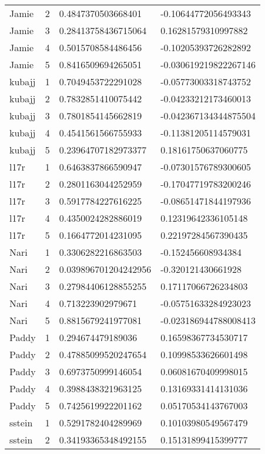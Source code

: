 \begin{longtable}{@{}lcll@{}}
      Jamie & 2 & 0.4847370503668401 & -0.10644772056493343 \\
      Jamie & 3 & 0.28413758436715064 & 0.16281579310997882 \\
      Jamie & 4 & 0.5015708584486456 & -0.10205393726282892 \\
      Jamie & 5 & 0.8416509694265051 & -0.030619219822267146 \\
      kubajj & 1 & 0.7049453722291028 & -0.05773003318743752 \\
      kubajj & 2 & 0.7832851410075442 & -0.04233212173460013 \\
      kubajj & 3 & 0.7801854145662819 & -0.042367134344875504 \\
      kubajj & 4 & 0.4541561566755933 & -0.11381205114579031 \\
      kubajj & 5 & 0.23964707182973377 & 0.18161750637060775 \\
      l17r & 1 & 0.6463837866590947 & -0.07301576789300605 \\
      l17r & 2 & 0.2801163044252959 & -0.17047719783200246 \\
      l17r & 3 & 0.5917784227616225 & -0.08651471844197936 \\
      l17r & 4 & 0.4350024282886019 & 0.12319642336105148 \\
      l17r & 5 & 0.1664772014231095 & 0.22197284567390435 \\
      Nari & 1 & 0.3306282216863503 & -0.152456608934384 \\
      Nari & 2 & 0.039896701204242956 & -0.320121430661928 \\
      Nari & 3 & 0.27984406128855255 & 0.17117066726234803 \\
      Nari & 4 & 0.713223902979671 & -0.05751633284923023 \\
      Nari & 5 & 0.8815679241977081 & -0.023186944788008413 \\
      Paddy & 1 & 0.294674479189036 & 0.16598367734530717 \\
      Paddy & 2 & 0.47885099520247654 & 0.10998533626601498 \\
      Paddy & 3 & 0.6973750999146054 & 0.06081670409998015 \\
      Paddy & 4 & 0.3988438321963125 & 0.13169331414131036 \\
      Paddy & 5 & 0.7425619922201162 & 0.05170534143767003 \\
      sstein & 1 & 0.5291782404289969 & 0.10103980549567479 \\
      sstein & 2 & 0.34193365348492155 & 0.15131899415399777 \\

\end{longtable}
